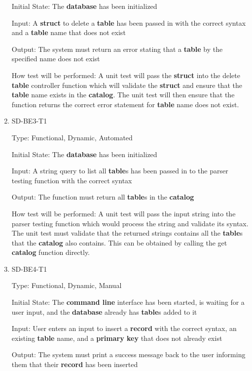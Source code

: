 \documentclass[12pt, titlepage]{article}
\begin{document}
\begin{enumerate}
Initial State: The \textbf{database} has been initialized
					
Input: A \textbf{struct} to delete a \textbf{table} has been passed in with the correct syntax and a \textbf{table} name that does not exist
					
Output: The system must return an error stating that a \textbf{table} by the specified name does not exist
					
How test will be performed: A unit test will pass the \textbf{struct} into the delete \textbf{table} controller function which will validate the \textbf{struct} and ensure that the \textbf{table} name exists in the \textbf{catalog}. The unit test will then ensure that the function returns the correct error statement for \textbf{table} name does not exist.

\item{SD-BE3-T1}

Type: Functional, Dynamic, Automated
					
Initial State: The \textbf{database} has been initialized
					
Input: A string query to list all \textbf{table}s has been passed in to the parser testing function with the correct syntax
					
Output: The function must return all \textbf{table}s in the \textbf{catalog}
					
How test will be performed: A unit test will pass the input string into the parser testing function which would process the string and validate its syntax. The unit test must validate that the returned strings contains all the \textbf{table}s that the \textbf{catalog} also contains. This can be obtained by calling the get \textbf{catalog} function directly.

\item{SD-BE4-T1}

Type: Functional, Dynamic, Manual
					
Initial State: The \textbf{command line} interface has been started, is waiting for a user input, and the \textbf{database} already has \textbf{table}s added to it
					
Input: User enters an input to insert a \textbf{record} with the correct syntax, an existing \textbf{table} name, and a \textbf{primary key} that does not already exist
					
Output: The system must print a success message back to the user informing them that their \textbf{record} has been inserted
					

\end{enumerate}
\end{document}
